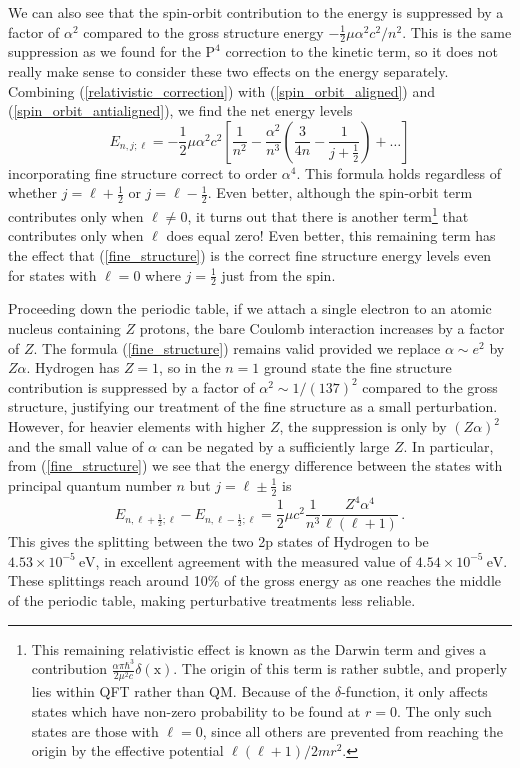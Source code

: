 \documentclass{article}
\theoremstyle{plain}\theoremheaderfont{\normalfont\itshape}\theorembodyfont{\rmfamily}\theoremseparator{.}\newtheorem*{rem}{Remark}\newtheorem*{ex}{Example}\newtheorem*{proof}{Proof}\newtheorem*{altp}{Alternative proof}
\theoremstyle{plain}\theoremheaderfont{\normalfont\bfseries}\theorembodyfont{\rmfamily}\theoremseparator{.}\newtheorem{thm}{Theorem}[section]\newtheorem{lem}[thm]{Lemma}\newtheorem{prop}[thm]{Proposition}\newtheorem*{cor}{Corollary}\newtheorem{defn}[thm]{Definition}\newtheorem{clm}[thm]{Claim}\newtheorem{clminproof}{Claim}
\theoremstyle{break}\theoremheaderfont{\normalfont\itshape}\theorembodyfont{\rmfamily}\theoremseparator{.\medskip}\newtheorem*{proofskip}{Proof}\newtheorem*{exs}{Examples}\newtheorem*{rems}{Remarks}
\theoremstyle{break}\theoremheaderfont{\normalfont\bfseries}\theorembodyfont{\rmfamily}\theoremseparator{.\medskip}\newtheorem{lemskip}[thm]{Lemma}\newtheorem{defnskip}[thm]{Definition}\newtheorem{propskip}[thm]{Proposition}\newtheorem{thmskip}[thm]{Theorem}
\numberwithin{equation}{section}
\newcommand{\unit}[1]{\ \mathrm{#1}}
\newcommand{\vb}[1]{\bm{\mathrm{#1}}}
\begin{document}
    We can also see that the spin-orbit contribution to the energy is suppressed by a factor of \(\alpha^2\) compared to the gross structure energy \(-\frac{1}{2}\mu\alpha^2c^2/n^2\). This is the same suppression as we found for the \(\vb{P}^4\) correction to the kinetic term, so it does not really make sense to consider these two effects on the energy separately. Combining (\ref{relativistic_correction}) with (\ref{spin_orbit_aligned}) and (\ref{spin_orbit_antialigned}), we find the net energy levels
    \begin{equation}\label{fine_structure}
        E_{n,j;\ell}=-\frac{1}{2}\mu\alpha^2 c^2\left[\frac{1}{n^2}-\frac{\alpha^2}{n^3}\left(\frac{3}{4n}-\frac{1}{j+\frac{1}{2}}\right)+\dots\right]
    \end{equation}
    incorporating fine structure correct to order \(\alpha^4\). This formula holds regardless of whether \(j=\ell+\frac{1}{2}\) or \(j=\ell-\frac{1}{2}\). Even better, although the spin-orbit term contributes only when \(\ell\ne 0\), it turns out that there is another term\footnote{This remaining relativistic effect is known as the Darwin term and gives a contribution \(\frac{\alpha\pi\hbar^3}{2\mu^2 c}\delta(\vb{x})\). The origin of this term is rather subtle, and properly lies within QFT rather than QM. Because of the \(\delta\)-function, it only affects states which have non-zero probability to be found at \(r=0\). The only such states are those with \(\ell=0\), since all others are prevented from reaching the origin by the effective potential \(\ell(\ell+1)/2mr^2\).} that contributes only when \(\ell\) does equal zero! Even better, this remaining term has the effect that (\ref{fine_structure}) is the correct fine structure energy levels even for states with \(\ell=0\) where \(j=\frac{1}{2}\) just from the spin.

    Proceeding down the periodic table, if we attach a single electron to an atomic nucleus containing \(Z\) protons, the bare Coulomb interaction increases by a factor of \(Z\). The formula (\ref{fine_structure}) remains valid provided we replace \(\alpha\sim e^2\) by \(Z\alpha\). Hydrogen has \(Z=1\), so in the \(n=1\) ground state the fine structure contribution is suppressed by a factor of \(\alpha^2\sim 1/(137)^2\) compared to the gross structure, justifying our treatment of the fine structure as a small perturbation. However, for heavier elements with higher \(Z\), the suppression is only by \((Z\alpha)^2\) and the small value of \(\alpha\) can be negated by a sufficiently large \(Z\). In particular, from (\ref{fine_structure}) we see that the energy difference between the states with principal quantum number \(n\) but \(j=\ell\pm\frac{1}{2}\) is
    \begin{equation}
        E_{n,\ell+\frac{1}{2};\ell}-E_{n,\ell-\frac{1}{2};\ell}=\frac{1}{2}\mu c^2\frac{1}{n^3}\frac{Z^4\alpha^4}{\ell(\ell+1)}\,.
    \end{equation}
    This gives the splitting between the two 2p states of Hydrogen to be \(4.53\times 10^{-5}\unit{eV}\), in excellent agreement with the measured value of \(4.54\times 10^{-5}\unit{eV}\). These splittings reach around 10\% of the gross energy as one reaches the middle of the periodic table, making perturbative treatments less reliable.
\end{document}
